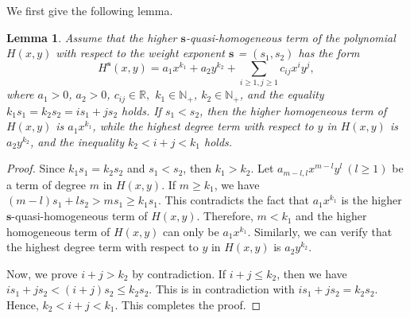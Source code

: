 \documentclass[10pt,a4paper]{amsart}
\numberwithin{equation}{section}
\newtheorem{lemma}[theo]{Lemma}
\begin{document}
We first give the following lemma.

\begin{lemma}\label{lem3.2}
Assume that the higher $\mathbf{s}$-quasi-homogeneous term of the polynomial $H(x,y)$ 
with respect to the weight exponent $\mathbf{s}$ = $(s_1,s_2)$ has the  form
\[
H^{\mathbf{s}}(x,y)=a_1x^{k_1}+a_2y^{k_2}+\sum_{i\geq 1, j\geq 1} c_{ij}x^{i}y^{j},
\]
where $a_1>0$, $a_2>0$, $c_{ij}\in \mathbb{R}, $ $k_1\in \mathbb{N}_+$, 
$k_2\in \mathbb{N}_+$, and the equality $k_1s_1=k_2s_2=is_1+js_2$ holds. 
If $s_1<s_2$, then the higher homogeneous term of $H(x,y)$ is $a_1x^{k_1}$, while 
the highest degree term with respect to $y$ in $H(x,y)$ is $a_2y^{k_2}$, and the 
inequality $k_2<i+j<k_1$ holds.
\end{lemma}

\begin{proof}
Since $k_1s_1=k_2s_2$ and $s_1<s_2$, then $k_1>k_2$. 
Let $a_{m-l,l}x^{m-l}y^{l}\ (l\geq 1)$ be a term of degree $m$ in $H(x,y)$. 
If $m\geq k_1$, we have $(m-l)s_1+ls_2> ms_1\geq k_1s_1$. This contradicts the fact 
that $a_1x^{k_1}$ is the higher $\mathbf{s}$-quasi-homogeneous term of $H(x,y)$. 
Therefore, $m<k_1$ and the higher homogeneous term of $H(x,y)$ can only be $a_1x^{k_1}$. 
Similarly, we can verify that the highest degree term with respect to $y$ in $H(x,y)$ 
is $a_2y^{k_2}$.

Now, we prove $i+j > k_2$ by contradiction. If $i+j\leq k_2$, then we have 
$is_1+js_2<(i+j)s_2\leq k_2s_2$. This is in contradiction with $is_1+js_2=k_2s_2$. 
Hence, $k_2<i+j<k_1$.
This completes the proof.
\end{proof}
\end{document}
